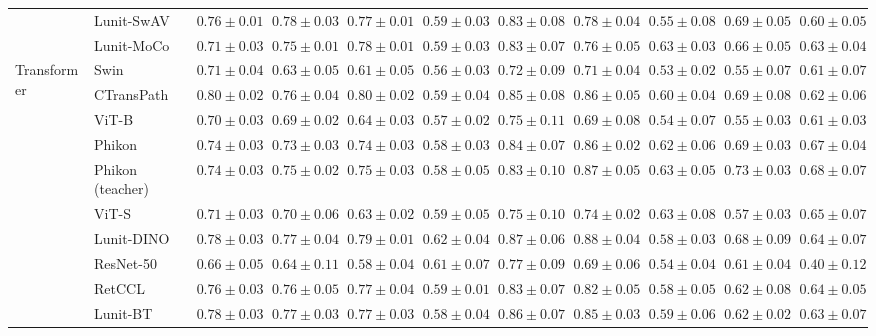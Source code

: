 \begin{tabular}{ll|cccc|c|cccc}
 & Lunit-SwAV & $0.76 \pm 0.01$ & $0.78 \pm 0.03$ & $0.77 \pm 0.01$ & $0.59 \pm 0.03$ & $0.83 \pm 0.08$ & $0.78 \pm 0.04$ & $0.55 \pm 0.08$ & $0.69 \pm 0.05$ & $0.60 \pm 0.05$ \\
 & Lunit-MoCo & $0.71 \pm 0.03$ & $0.75 \pm 0.01$ & $0.78 \pm 0.01$ & $0.59 \pm 0.03$ & $0.83 \pm 0.07$ & $0.76 \pm 0.05$ & $0.63 \pm 0.03$ & $0.66 \pm 0.05$ & $0.63 \pm 0.04$ \\
\cline{1-11}
\multirow[t]{12}{*}{Transformer} & Swin & $0.71 \pm 0.04$ & $0.63 \pm 0.05$ & $0.61 \pm 0.05$ & $0.56 \pm 0.03$ & $0.72 \pm 0.09$ & $0.71 \pm 0.04$ & $0.53 \pm 0.02$ & $0.55 \pm 0.07$ & $0.61 \pm 0.07$ \\
 & CTransPath & $\mathbf{0.80 \pm 0.02}$ & $0.76 \pm 0.04$ & $\mathbf{0.80 \pm 0.02}$ & $0.59 \pm 0.04$ & $0.85 \pm 0.08$ & $0.86 \pm 0.05$ & $0.60 \pm 0.04$ & $0.69 \pm 0.08$ & $0.62 \pm 0.06$ \\
 & ViT-B & $0.70 \pm 0.03$ & $0.69 \pm 0.02$ & $0.64 \pm 0.03$ & $0.57 \pm 0.02$ & $0.75 \pm 0.11$ & $0.69 \pm 0.08$ & $0.54 \pm 0.07$ & $0.55 \pm 0.03$ & $0.61 \pm 0.03$ \\
 & Phikon & $0.74 \pm 0.03$ & $0.73 \pm 0.03$ & $0.74 \pm 0.03$ & $0.58 \pm 0.03$ & $0.84 \pm 0.07$ & $0.86 \pm 0.02$ & $0.62 \pm 0.06$ & $0.69 \pm 0.03$ & $0.67 \pm 0.04$ \\
 & Phikon (teacher) & $0.74 \pm 0.03$ & $0.75 \pm 0.02$ & $0.75 \pm 0.03$ & $0.58 \pm 0.05$ & $0.83 \pm 0.10$ & $0.87 \pm 0.05$ & $\mathbf{0.63 \pm 0.05}$ & $\mathbf{0.73 \pm 0.03}$ & $\mathbf{0.68 \pm 0.07}$ \\
 & ViT-S & $0.71 \pm 0.03$ & $0.70 \pm 0.06$ & $0.63 \pm 0.02$ & $0.59 \pm 0.05$ & $0.75 \pm 0.10$ & $0.74 \pm 0.02$ & $0.63 \pm 0.08$ & $0.57 \pm 0.03$ & $0.65 \pm 0.07$ \\
 & Lunit-DINO & $0.78 \pm 0.03$ & $0.77 \pm 0.04$ & $0.79 \pm 0.01$ & $0.62 \pm 0.04$ & $\mathbf{0.87 \pm 0.06}$ & $\mathbf{0.88 \pm 0.04}$ & $0.58 \pm 0.03$ & $0.68 \pm 0.09$ & $0.64 \pm 0.07$ \\
 & ResNet-50 & $0.66 \pm 0.05$ & $0.64 \pm 0.11$ & $0.58 \pm 0.04$ & $0.61 \pm 0.07$ & $0.77 \pm 0.09$ & $0.69 \pm 0.06$ & $0.54 \pm 0.04$ & $0.61 \pm 0.04$ & $0.40 \pm 0.12$ \\
 & RetCCL & $0.76 \pm 0.03$ & $0.76 \pm 0.05$ & $0.77 \pm 0.04$ & $0.59 \pm 0.01$ & $0.83 \pm 0.07$ & $0.82 \pm 0.05$ & $0.58 \pm 0.05$ & $0.62 \pm 0.08$ & $0.64 \pm 0.05$ \\
 & Lunit-BT & $0.78 \pm 0.03$ & $0.77 \pm 0.03$ & $0.77 \pm 0.03$ & $0.58 \pm 0.04$ & $0.86 \pm 0.07$ & $0.85 \pm 0.03$ & $0.59 \pm 0.06$ & $0.62 \pm 0.02$ & $0.63 \pm 0.07$ \\

\end{tabular}
